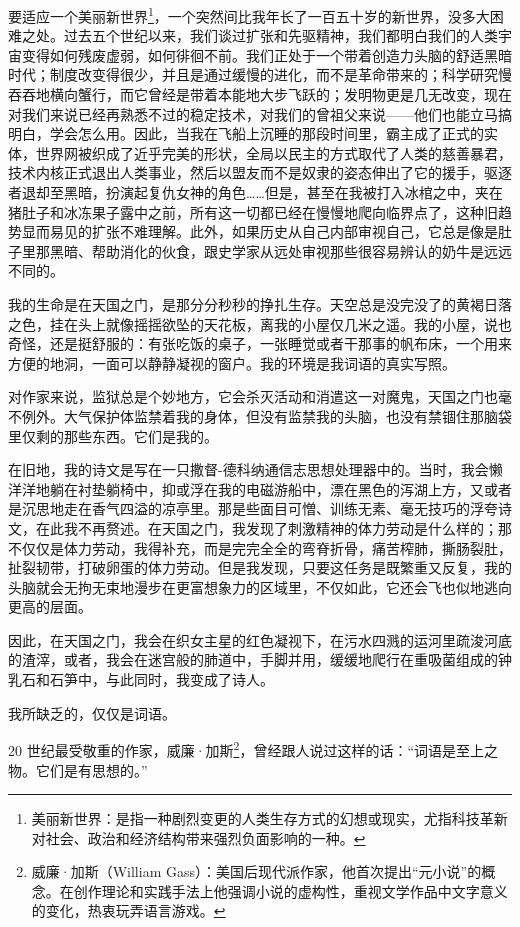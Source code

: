 \documentclass[AutoFakeBold=true]{book}
\begin{document}
要适应一个美丽新世界\footnote{美丽新世界：是指一种剧烈变更的人类生存方式的幻想或现实，尤指科技革新对社会、政治和经济结构带来强烈负面影响的一种。}，一个突然间比我年长了一百五十岁的新世界，没多大困难之处。过去五个世纪以来，我们谈过扩张和先驱精神，我们都明白我们的人类宇宙变得如何残废虚弱，如何徘徊不前。我们正处于一个带着创造力头脑的舒适黑暗时代；制度改变得很少，并且是通过缓慢的进化，而不是革命带来的；科学研究慢吞吞地横向蟹行，而它曾经是带着本能地大步飞跃的；发明物更是几无改变，现在对我们来说已经再熟悉不过的稳定技术，对我们的曾祖父来说——他们也能立马搞明白，学会怎么用。因此，当我在飞船上沉睡的那段时间里，霸主成了正式的实体，世界网被织成了近乎完美的形状，全局以民主的方式取代了人类的慈善暴君，技术内核正式退出人类事业，然后以盟友而不是奴隶的姿态伸出了它的援手，驱逐者退却至黑暗，扮演起复仇女神的角色……但是，甚至在我被打入冰棺之中，夹在猪肚子和冰冻果子露中之前，所有这一切都已经在慢慢地爬向临界点了，这种旧趋势显而易见的扩张不难理解。此外，如果历史从自己内部审视自己，它总是像是肚子里那黑暗、帮助消化的伙食，跟史学家从远处审视那些很容易辨认的奶牛是远远不同的。

我的生命是在天国之门，是那分分秒秒的挣扎生存。天空总是没完没了的黄褐日落之色，挂在头上就像摇摇欲坠的天花板，离我的小屋仅几米之遥。我的小屋，说也奇怪，还是挺舒服的：有张吃饭的桌子，一张睡觉或者干那事的帆布床，一个用来方便的地洞，一面可以静静凝视的窗户。我的环境是我词语的真实写照。

对作家来说，监狱总是个妙地方，它会杀灭活动和消遣这一对魔鬼，天国之门也毫不例外。大气保护体监禁着我的身体，但没有监禁我的头脑，也没有禁锢住那脑袋里仅剩的那些东西。它们是我的。

在旧地，我的诗文是写在一只撒督-德科纳通信志思想处理器中的。当时，我会懒洋洋地躺在衬垫躺椅中，抑或浮在我的电磁游船中，漂在黑色的泻湖上方，又或者是沉思地走在香气四溢的凉亭里。那是些面目可憎、训练无素、毫无技巧的浮夸诗文，在此我不再赘述。在天国之门，我发现了刺激精神的体力劳动是什么样的；那不仅仅是体力劳动，我得补充，而是完完全全的弯脊折骨，痛苦榨肺，撕肠裂肚，扯裂韧带，打破卵蛋的体力劳动。但是我发现，只要这任务是既繁重又反复，我的头脑就会无拘无束地漫步在更富想象力的区域里，不仅如此，它还会飞也似地逃向更高的层面。

因此，在天国之门，我会在织女主星的红色凝视下，在污水四溅的运河里疏浚河底的渣滓，或者，我会在迷宫般的肺道中，手脚并用，缓缓地爬行在重吸菌组成的钟乳石和石笋中，与此同时，我变成了诗人。

我所缺乏的，仅仅是词语。

\vspace*{1em}

20 世纪最受敬重的作家，威廉·加斯\footnote{威廉·加斯（William Gass）：美国后现代派作家，他首次提出``元小说''的概念。在创作理论和实践手法上他强调小说的虚构性，重视文学作品中文字意义的变化，热衷玩弄语言游戏。}，曾经跟人说过这样的话：``词语是至上之物。它们是有思想的。''
\end{document}
